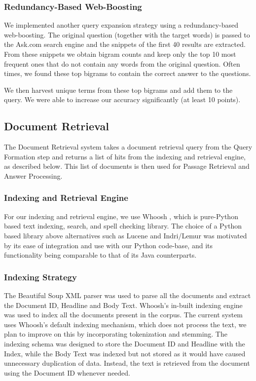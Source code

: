 \documentclass[11pt]{article}
\begin{document}
\subsubsection{Redundancy-Based Web-Boosting}
We implemented another query expansion strategy using a redundancy-based web-boosting. The original question (together with the target words) is passed to the Ask.com search engine and the snippets of the first 40 results are extracted. From these snippets we obtain bigram counts and keep only the top 10 most frequent ones that do not contain any words from the original question. Often times, we found these top bigrams to  contain the correct answer to the questions.

We then harvest unique terms from these top bigrams and add them to the query. We were able to increase our accuracy significantly (at least 10 points).

\subsection{Document Retrieval}
The Document Retrieval system takes a document retrieval query from the Query Formation step and returns a list of hits from the indexing and retrieval engine, as described below. This list of documents is then used for Passage Retrieval and Answer Processing.

\subsubsection{Indexing and Retrieval Engine}
For our indexing and retrieval engine, we use Whoosh \cite{whoosh}, which is pure-Python based text indexing, search, and spell checking library. The choice of a Python based library above alternatives such as Lucene and Indri/Lemur was motivated by its ease of integration and use with our Python code-base, and its functionality being comparable to that of its Java counterparts.

\subsubsection{Indexing Strategy}
The Beautiful Soup XML parser \cite{bsoup} was used to parse all the documents and extract the Document ID, Headline and Body Text. Whoosh's in-built indexing engine was used to index all the documents present in the corpus. The current system uses Whoosh's default indexing mechanism, which does not process the text, we plan to improve on this by incorporating tokenization and stemming. The indexing schema was designed to store the Document ID and Headline with the Index, while the Body Text was indexed but not stored as it would have caused unnecessary duplication of data. Instead, the text is retrieved from the document using the Document ID whenever needed.
\end{document}
